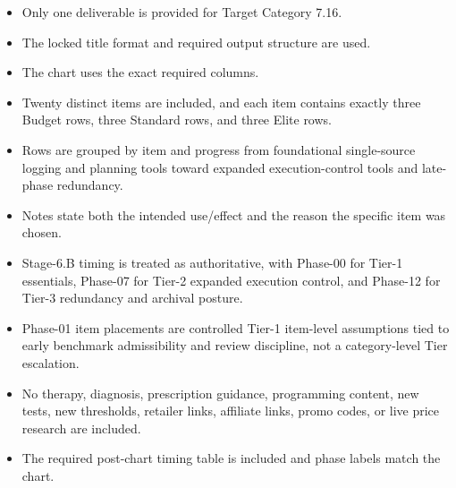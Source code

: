 \documentclass[10pt]{article}
\begin{document}
\begin{itemize}
\item Only one deliverable is provided for Target Category 7.16.
\item The locked title format and required output structure are used.
\item The chart uses the exact required columns.
\item Twenty distinct items are included, and each item contains exactly three Budget rows, three Standard rows, and three Elite rows.
\item Rows are grouped by item and progress from foundational single-source logging and planning tools toward expanded execution-control tools and late-phase redundancy.
\item Notes state both the intended use/effect and the reason the specific item was chosen.
\item Stage-6.B timing is treated as authoritative, with Phase-00 for Tier-1 essentials, Phase-07 for Tier-2 expanded execution control, and Phase-12 for Tier-3 redundancy and archival posture.
\item Phase-01 item placements are controlled Tier-1 item-level assumptions tied to early benchmark admissibility and review discipline, not a category-level Tier escalation.
\item No therapy, diagnosis, prescription guidance, programming content, new tests, new thresholds, retailer links, affiliate links, promo codes, or live price research are included.
\item The required post-chart timing table is included and phase labels match the chart.
\end{itemize}
\end{document}
